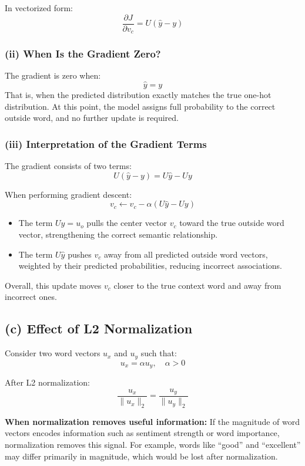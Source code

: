 \documentclass[11pt]{article}
\begin{document}
In vectorized form:
\[
\boxed{
\frac{\partial J}{\partial v_c} = U(\hat{y} - y)
}
\]

\subsubsection*{(ii) When Is the Gradient Zero?}

The gradient is zero when:
\[
\hat{y} = y
\]
That is, when the predicted distribution exactly matches the true one-hot distribution.  
At this point, the model assigns full probability to the correct outside word, and no further update is required.

\subsubsection*{(iii) Interpretation of the Gradient Terms}

The gradient consists of two terms:
\[
U(\hat{y} - y) = U\hat{y} - Uy
\]

When performing gradient descent:
\[
v_c \leftarrow v_c - \alpha (U\hat{y} - Uy)
\]

\begin{itemize}
  \item The term $Uy = u_o$ pulls the center vector $v_c$ toward the true outside word vector, strengthening the correct semantic relationship.
  \item The term $U\hat{y}$ pushes $v_c$ away from all predicted outside word vectors, weighted by their predicted probabilities, reducing incorrect associations.
\end{itemize}

Overall, this update moves $v_c$ closer to the true context word and away from incorrect ones.

\subsection*{(c) Effect of L2 Normalization}

Consider two word vectors $u_x$ and $u_y$ such that:
\[
u_x = \alpha u_y, \quad \alpha > 0
\]

After L2 normalization:
\[
\frac{u_x}{\|u_x\|_2} = \frac{u_y}{\|u_y\|_2}
\]

\textbf{When normalization removes useful information:}
If the magnitude of word vectors encodes information such as sentiment strength or word importance, normalization removes this signal. For example, words like ``good'' and ``excellent'' may differ primarily in magnitude, which would be lost after normalization.
\end{document}
